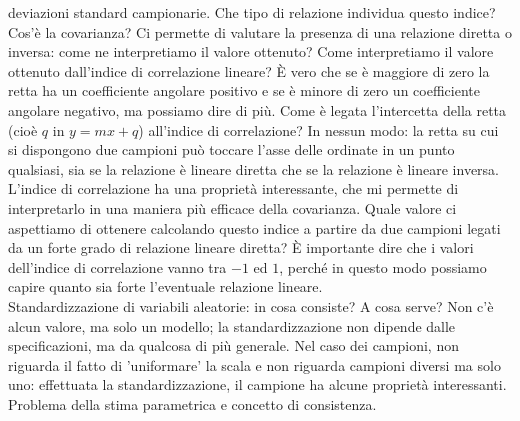 \documentclass{article}
\begin{document}
    deviazioni standard campionarie. Che tipo di relazione individua questo indice? Cos'è la covarianza? Ci permette di valutare la presenza di una relazione diretta o
    inversa: come ne interpretiamo il valore ottenuto? Come interpretiamo il valore ottenuto dall'indice di correlazione lineare? È vero che se è maggiore di zero la retta ha
    un coefficiente angolare positivo e se è minore di zero un coefficiente angolare negativo, ma possiamo dire di più. Come è legata l'intercetta della retta (cioè $ q $ in
    $ y = mx + q $) all'indice di correlazione? In nessun modo: la retta su cui si dispongono due campioni può toccare l'asse delle ordinate in un punto qualsiasi, sia se la
    relazione è lineare diretta che se la relazione è lineare inversa. L'indice di correlazione ha una proprietà interessante, che mi permette di interpretarlo in una maniera
    più efficace della covarianza. Quale valore ci aspettiamo di ottenere calcolando questo indice a partire da due campioni legati da un forte grado di relazione lineare
    diretta? È importante dire che i valori dell'indice di correlazione vanno tra $ -1 $ ed $ 1 $, perché in questo modo possiamo capire quanto sia forte l'eventuale relazione
    lineare. \\
    
    Standardizzazione di variabili aleatorie: in cosa consiste? A cosa serve? Non c'è alcun valore, ma solo un modello; la standardizzazione non dipende dalle specificazioni,
    ma da qualcosa di più generale. Nel caso dei campioni, non riguarda il fatto di 'uniformare' la scala e non riguarda campioni diversi ma solo uno: effettuata la
    standardizzazione, il campione ha alcune proprietà interessanti. \\
    Problema della stima parametrica e concetto di consistenza.
    
\end{document}
